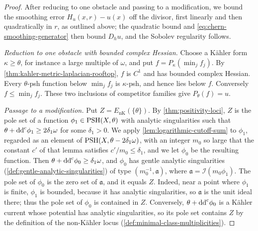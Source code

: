 \begin{proof}
After reducing to one obstacle and passing to a modification, we bound the smoothing error $H_u(x,r)-u(x)$ off the divisor, first linearly and then quadratically in $r$, as outlined above; the quadratic bound and \eqref{eq:chern-smoothing-generator} then bound $D_hu$, and the Sobolev regularity follows.

\emph{Reduction to one obstacle with bounded complex Hessian.} Choose a K\"ahler form $\kappa\geq\theta$, for instance a large multiple of $\omega$, and put $f=P_\kappa(\min_jf_j)$. By \cref{thm:kahler-metric-laplacian-rooftop}, $f$ is $C^1$ and has bounded complex Hessian. Every $\theta$-psh function below $\min_jf_j$ is $\kappa$-psh, and hence lies below $f$. Conversely $f\leq\min_jf_j$. These two inclusions of competitor families give $P_\theta(f)=u$.

\emph{Passage to a modification.} Put $Z=E_{\mathrm{nK}}(\{\theta\})$. By \cref{thm:positivity-loci}, $Z$ is the pole set of a function $\phi_1\in\mathrm{PSH}(X,\theta)$ with analytic singularities such that $\theta+\mathrm{dd}^{\mathrm{c}}\phi_1\geq2\delta_1\omega$ for some $\delta_1>0$. We apply \cref{lem:logarithmic-cutoff-sum} to $\phi_1$, regarded as an element of $\mathrm{PSH}(X,\theta-2\delta_1\omega)$, with an integer $m_0$ so large that the constant $c'$ of that lemma satisfies $c'/m_0\leq\delta_1$, and we let $\phi_0$ be the resulting function. Then $\theta+\mathrm{dd}^{\mathrm{c}}\phi_0\geq\delta_1\omega$, and $\phi_0$ has gentle analytic singularities (\cref{def:gentle-analytic-singularities}) of type $(m_0^{-1},\mathfrak a)$, where $\mathfrak a=\mathcal I(m_0\phi_1)$. The pole set of $\phi_0$ is the zero set of $\mathfrak a$, and it equals $Z$. Indeed, near a point where $\phi_1$ is finite, $\phi_1$ is bounded, because it has analytic singularities, so $\mathfrak a$ is the unit ideal there; thus the pole set of $\phi_0$ is contained in $Z$. Conversely, $\theta+\mathrm{dd}^{\mathrm{c}}\phi_0$ is a K\"ahler current whose potential has analytic singularities, so its pole set contains $Z$ by the definition of the non-K\"ahler locus (\cref{def:minimal-class-multiplicities}).


\end{proof}
